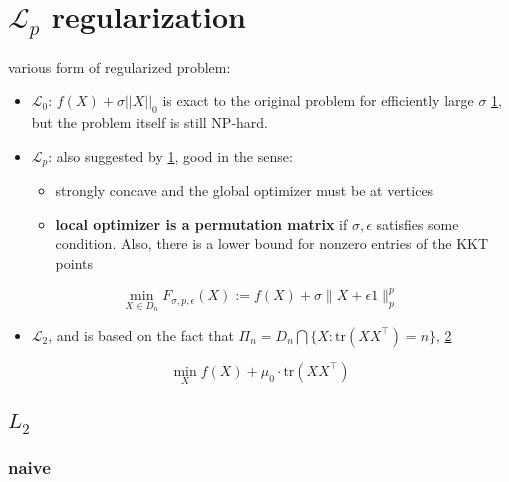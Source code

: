 \documentclass[
  10pt,
  a4paper,
,tablecaptionabove
]{scrartcl}
\providecommand{\tightlist}{%
  \setlength{\itemsep}{0pt}\setlength{\parskip}{0pt}}
\begin{document}
\hypertarget{mathscr-l_p-regularization}{%
\section{\texorpdfstring{\(\mathscr L_p\)
regularization}{\textbackslash mathscr L\_p regularization}}\label{mathscr-l_p-regularization}}

various form of regularized problem:

\begin{itemize}
\item
  \(\mathscr L_0\): \(f(X) + \sigma ||X||_0\) is exact to the original
  problem for efficiently large \(\sigma\)
  \protect\hyperlink{ref-jiang_l_p-norm_2016}{1}, but the problem itself
  is still NP-hard.
\item
  \(\mathscr L_p\): also suggested by
  \protect\hyperlink{ref-jiang_l_p-norm_2016}{1}, good in the sense:

  \begin{itemize}
  \tightlist
  \item
    strongly concave and the global optimizer must be at vertices
  \item
    \textbf{local optimizer is a permutation matrix} if
    \(\sigma, \epsilon\) satisfies some condition. Also, there is a
    lower bound for nonzero entries of the KKT points
  \end{itemize}
\end{itemize}

\[\min _{X \in D _{n}} F_{\sigma, p, \epsilon}(X):=f(X)+\sigma\|X+\epsilon 1 \|_{p}^{p}\]

\begin{itemize}
\tightlist
\item
  \(\mathscr L_2\), and is based on the fact that
  \(\Pi_n = D_n \bigcap \{X:\textrm{tr}(XX^\top) = n\}\),
  \protect\hyperlink{ref-xia_efficient_2010}{2}
\end{itemize}

\[\min_Xf(X)+\mu_{0} \cdot \textrm{tr} \left(X X^{\top}\right)\]

\hypertarget{l_2}{%
\subsection{\texorpdfstring{\(L_2\)}{L\_2}}\label{l_2}}

\hypertarget{naive}{%
\subsubsection{naive}\label{naive}}
\end{document}
